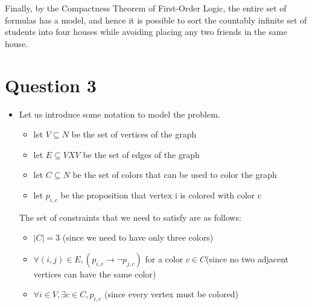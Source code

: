 \documentclass{article}
\begin{document}
Finally, by the Compactness Theorem of First-Order Logic, the entire set of formulas has a model, and hence it is possible to sort the countably infinite set of students into four houses while avoiding placing any two friends in the same house.

\section{Question 3}

\begin{itemize}
    \item Let us introduce some notation to model the problem.
    
    \begin{itemize}
        \item let $V \subseteq N$ be the set of vertices of the graph 
        \item let $E \subseteq V X V$ be the set of edges of the graph
        \item let $C \subseteq N$ be the set of colors that can be used to color the graph
        \item let $p_{i,c}$ be the proposition that vertex i is colored with color c
    \end{itemize}

    The set of constraints that we need to satisfy are as follows:

    \begin{itemize}
        \item $|C| = 3$ (since we need to have only three colors)
        \item $\forall (i,j) \in E, (p_{i,c} \rightarrow \neg{p_{j,c}})$ for a color $c \in C$(since no two adjacent vertices can have the same color)
        \item $\forall i \in V, \exists c \in C, p_{i,c}$ (since every vertex must be colored)
    \end{itemize}




\end{itemize}
\end{document}
